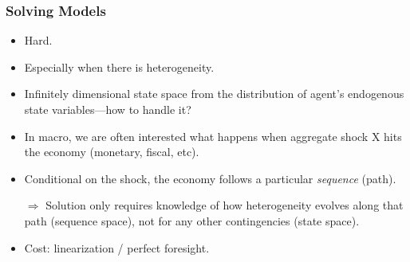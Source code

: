 \documentclass[english,xcolor=svgnames]{beamer}
\begin{document}
\begin{frame}
    \frametitle{Solving Models}
    \begin{itemize}
        \item Hard.
        \item Especially when there is heterogeneity.
        \item Infinitely dimensional state space from the distribution of agent's endogenous state variables---how to handle it?
        \item In macro, we are often interested what happens when aggregate shock X hits the economy (monetary, fiscal, etc).
        \item Conditional on the shock, the economy follows a particular \emph{sequence} (path).
        \item[$\Rightarrow$] Solution only requires knowledge of how heterogeneity evolves along that path (sequence space), not for any other contingencies (state space). 
       	\item Cost: linearization / perfect foresight.
    \end{itemize}
\end{frame}
\end{document}
